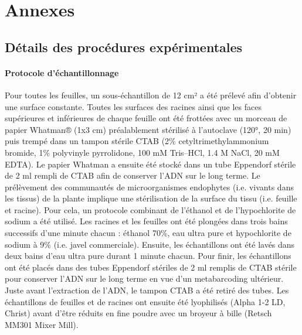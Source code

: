 \documentclass[a4paper,12pt]{article}
\begin{document}
\begingroup
\fontsize{10pt}{12pt}\selectfont
\renewcommand{\refname}{Références}



\endgroup


\newpage
\pagestyle{empty}
\listoffigures
\listoftables


\newpage
\appendix
\section{Annexes}
\subsection{Détails des procédures expérimentales}
\paragraph{Protocole d’échantillonnage}
Pour toutes les feuilles, un sous-échantillon de 12 cm² a été prélevé afin d’obtenir une surface constante. Toutes les surfaces des racines ainsi que les faces supérieures et inférieures de chaque feuille ont été frottées avec un morceau de papier Whatman® (1x3 cm) préalablement stérilisé à l’autoclave (120°, 20 min) puis trempé dans un tampon stérile CTAB (2\% cetyltrimethylammonium bromide, 1\% polyvinyle pyrrolidone, 100 mM Tris–HCl, 1.4 M NaCl, 20 mM EDTA). Le papier Whatman a ensuite été stocké dans un tube Eppendorf stérile de 2 ml rempli de CTAB afin de conserver l’ADN sur le long terme. Le prélèvement des communautés de microorganismes endophytes (i.e. vivants dans les tissus) de la plante implique une stérilisation de la surface du tissu (i.e. feuille et racine). Pour cela, un protocole combinant de l’éthanol et de l’hypochlorite de sodium \citep{sahu2022surface} a été utilisé. Les racines et les feuilles ont été plongées dans trois bains successifs d’une minute chacun : éthanol 70\%, eau ultra pure et hypochlorite de sodium à 9\% (i.e. javel commerciale). Ensuite, les échantillons ont été lavés dans deux bains d’eau ultra pure durant 1 minute chacun. Pour finir, les échantillons ont été placés dans des tubes Eppendorf stériles de 2 ml remplis de CTAB stérile pour conserver l’ADN sur le long terme en vue d’un metabarcoding ultérieur. Juste avant l’extraction de l’ADN, le tampon CTAB a été retiré des tubes. Les échantillons de feuilles et de racines ont ensuite été lyophilisés (Alpha 1-2 LD, Christ) avant d’être réduits en fine poudre avec un broyeur à bille (Retsch MM301 Mixer Mill).
\end{document}
